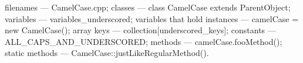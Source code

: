filenames — Camel\+Case.\+cpp; classes — class Camel\+Case extends Parent\+Object; variables — variables\+\_\+underscored; variables that hold instances — camel\+Case = new Camel\+Case(); array keys — collection\mbox{[}\textquotesingle{}underscored\+\_\+keys\textquotesingle{}\mbox{]}; constants — A\+L\+L\+\_\+\+C\+A\+P\+S\+\_\+\+A\+N\+D\+\_\+\+U\+N\+D\+E\+R\+S\+C\+O\+R\+ED; methods — camel\+Case.\+foo\+Method(); static methods — Camel\+Case\+::just\+Like\+Regular\+Method(). 